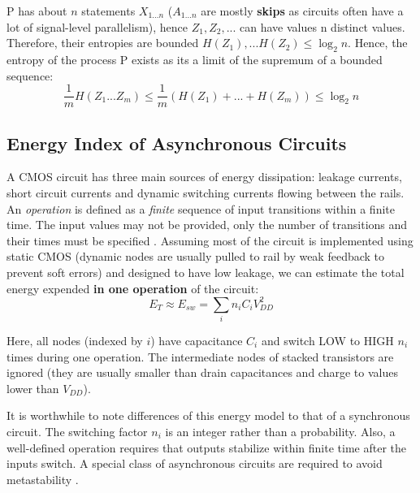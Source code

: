 P has about $n$ statements $X_{1...n}$ ($A_{1...n}$
are mostly \textbf{skips} as circuits often have a lot of signal-level
parallelism), hence $Z_1, Z_2, ...$ can have values n distinct values. 
Therefore, their entropies are bounded $H(Z_1), ... H(Z_2) \le \log_2{n}$.
Hence, the entropy of the process P exists as its a limit of the supremum
of a bounded sequence:
\begin{equation}
	\frac{1}{m} H(Z_1...Z_m) \le \frac{1}{m} (H(Z_1) + ... + H(Z_m)) \le
	\log_2{n}
\end{equation}

\subsection{Energy Index of Asynchronous Circuits}

A CMOS circuit has three main sources of energy dissipation: leakage currents,
short circuit currents and dynamic switching currents flowing between the rails.
An \emph{operation} is defined as a \emph{finite} sequence of input transitions
within a finite time. The input values may not be provided, only the number of
transitions and their times must be specified \cite{trace_theory}.
Assuming most of the circuit is implemented using static CMOS (dynamic nodes
are usually pulled to rail by weak feedback to prevent soft errors) and 
designed to have low leakage, we can estimate the total energy expended
\textbf{in one operation} of the circuit:
\begin{equation}
	E_T \approx E_{sw} = \sum_{i} n_i C_i V_{DD}^2 
\end{equation}

Here, all nodes (indexed by $i$) have capacitance $C_i$ and switch
 LOW to HIGH $n_i$ times during one operation.
The intermediate nodes of stacked transistors are ignored (they are usually smaller than drain
capacitances and charge to values lower than $V_{DD}$).

It is worthwhile to note differences of this energy model to that of a
synchronous circuit. The switching factor $n_i$ is an integer rather than a probability. 
Also, a well-defined operation requires that outputs stabilize within
finite time after the inputs switch. A special class of asynchronous circuits 
are required to avoid metastability \cite{seger_book}.
\\

